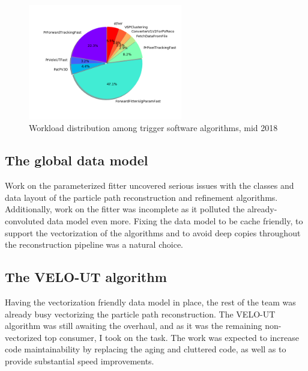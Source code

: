 \documentclass[12pt]{article}
\begin{document}
\begin{figure}[H]
	\begin{center}
		\includegraphics[width=0.6\textwidth]{algo_usage_original_bestphys}
	\end{center}
	\caption{Workload distribution among trigger software algorithms, mid 2018}
	\label{fig_algo_usage_choice}
\end{figure}


\subsection{The global data model}

Work on the parameterized fitter uncovered serious issues with the classes and data layout of the particle path reconstruction and refinement algorithms. Additionally, work on the fitter was incomplete as it polluted the already-convoluted data model even more. Fixing the data model to be cache friendly, to support the vectorization of the algorithms and to avoid deep copies throughout the reconstruction pipeline was a natural choice.


\subsection{The VELO-UT algorithm}

Having the vectorization friendly data model in place, the rest of the team was already busy vectorizing the particle path reconstruction. The VELO-UT algorithm was still awaiting the overhaul, and as it was the remaining non-vectorized top consumer, I took on the task. The work was expected to increase code maintainability by replacing the aging and cluttered code, as well as to provide substantial speed improvements.


\newpage
\end{document}
